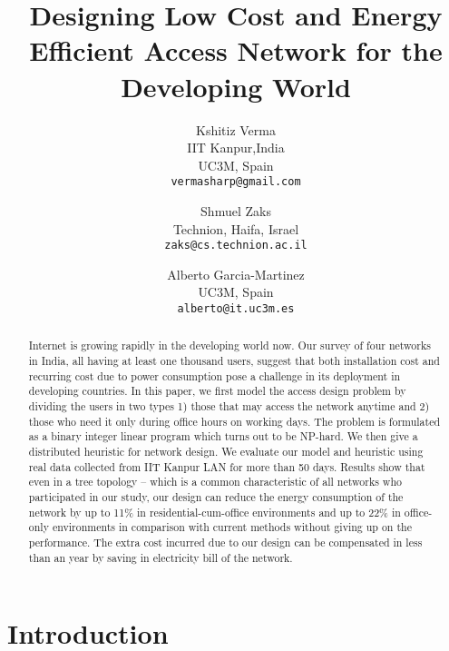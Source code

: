 \documentclass{article}
\begin{document}
\title{Designing Low Cost and Energy Efficient Access Network for the Developing World}

\author{
  Kshitiz Verma\\ IIT Kanpur,India \\ UC3M, Spain\\
  \texttt{vermasharp@gmail.com}
  \and
  Shmuel Zaks \\ Technion, Haifa, Israel\\
  \texttt{zaks@cs.technion.ac.il}
  \and
  Alberto Garcia-Martinez \\ UC3M, Spain\\
  \texttt{alberto@it.uc3m.es}
}





\maketitle


\begin{abstract}
Internet is growing rapidly in the developing world now. Our survey of four networks in India, all having at least one thousand users, suggest that both installation cost and recurring cost due to power consumption pose a challenge in its deployment in developing countries. In this paper, we first model the access design problem by dividing the users in two types 1) those that may access the network anytime and 2) those who need it only during office hours on working days. The problem is formulated as a binary integer linear program which turns out to be NP-hard. We then give a distributed heuristic for network design. We evaluate our model and heuristic using real data collected from IIT Kanpur LAN for more than 50 days. Results show that even in a tree topology -- which is a common characteristic of all networks who participated in our study, our design can reduce the energy consumption of the network by up to 11\% in residential-cum-office environments and up to 22\% in office-only environments in comparison with current methods without giving up on the performance. The extra cost incurred due to our design can be compensated in less than an year by saving in electricity bill of the network.
\end{abstract}

\section{Introduction} 
\label{sec:intro}
\end{document}

